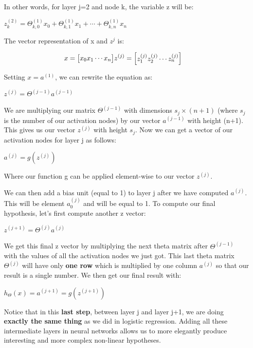 \documentclass[
]{book}
\begin{document}
In other words, for layer j=2 and node k, the variable z will be:

\(z_k^{(2)} = \Theta_{k,0}^{(1)}x_0 + \Theta_{k,1}^{(1)}x_1 + \cdots + \Theta_{k,n}^{(1)}x_n\)

The vector representation of x and \(z^{j}\) is:

\begin{align}x = \begin{bmatrix}x_0 \newline x_1 \newline\cdots \newline x_n\end{bmatrix} &z^{(j)} = \begin{bmatrix}z_1^{(j)} \newline z_2^{(j)} \newline\cdots \newline z_n^{(j)}\end{bmatrix}\end{align}

Setting \(x = a^{(1)}\), we can rewrite the equation as:

\(z^{(j)} = \Theta^{(j-1)}a^{(j-1)}\)

We are multiplying our matrix \(\Theta^{(j-1)}\) with dimensions \(s_j\times (n+1)\) (where \(s_j\) is the number of our activation nodes) by our vector \(a^{(j-1)}\) with height (n+1). This gives us our vector \(z^{(j)}\) with height \(s_j\). Now we can get a vector of our activation nodes for layer j as follows:

\(a^{(j)} = g(z^{(j)})\)

Where our function g can be applied element-wise to our vector \(z^{(j)}\).

We can then add a bias unit (equal to 1) to layer j after we have computed \(a^{(j)}\). This will be element \(a_0^{(j)}\) and will be equal to 1. To compute our final hypothesis, let's first compute another z vector:

\(z^{(j+1)} = \Theta^{(j)}a^{(j)}\)

We get this final z vector by multiplying the next theta matrix after \(\Theta^{(j-1)}\) with the values of all the activation nodes we just got. This last theta matrix \(\Theta^{(j)}\) will have only \textbf{one row} which is multiplied by one column \(a^{(j)}\) so that our result is a single number. We then get our final result with:

\(h_\Theta(x) = a^{(j+1)} = g(z^{(j+1)})\)

Notice that in this \textbf{last step}, between layer j and layer j+1, we are doing \textbf{exactly the same thing} as we did in logistic regression. Adding all these intermediate layers in neural networks allows us to more elegantly produce interesting and more complex non-linear hypotheses.
\end{document}
